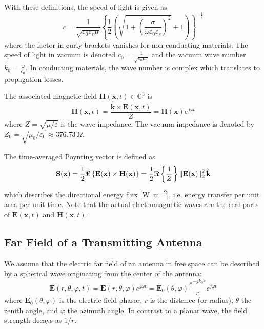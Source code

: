 With these definitions, the speed of light is given as~\cite[Eq. 4-28d]{Balanis}
\begin{equation}
    c=\frac{1}{\sqrt{\varepsilon_0\varepsilon_r\mu}}\left\{\frac12\left(\sqrt{1+\left(\frac{\sigma}{\omega\varepsilon_0\varepsilon_r}\right)^2}+1\right)\right\}^{-\frac{1}{2}}
\end{equation}
where the factor in curly brackets vanishes for non-conducting materials. The speed of light in vacuum is denoted $c_0=\frac{1}{\sqrt{\varepsilon_0 \mu_0}}$ and the vacuum wave number $k_0=\frac{\omega}{c_0}$. In conducting materials, the wave number is complex which translates to propagation losses.

The associated magnetic field $\mathbf{H}(\mathbf{x}, t)\in\mathbb{C}^3$ is
\begin{equation}
    \mathbf{H}(\mathbf{x}, t) = \frac{\hat{\mathbf{k}}\times  \mathbf{E}(\mathbf{x}, t)}{Z} = \mathbf{H}(\mathbf{x})e^{j\omega t}
\end{equation}
where $Z=\sqrt{\mu/\varepsilon}$ is the wave impedance. The vacuum impedance is denoted by $Z_0=\sqrt{\mu_0/\varepsilon_0}\approx 376.73\,\Omega$.

The time-averaged Poynting vector is defined as
\begin{equation}
    \mathbf{S}(\mathbf{x}) = \frac{1}{2} \Re\left\{\mathbf{E}(\mathbf{x})\times  \mathbf{H}(\mathbf{x})\right\}
                           = \frac{1}{2} \Re\left\{\frac{1}{Z} \right\} \left\lVert\mathbf{E}(\mathbf{x})\right\rVert_2^2 \hat{\mathbf{k}}
\end{equation}
which describes the directional energy flux [\si{\watt\per\meter\squared}], i.e. energy transfer per unit area per unit time.
Note that the actual electromagnetic waves are the real parts of $\mathbf{E}(\mathbf{x}, t)$ and $\mathbf{H}(\mathbf{x}, t)$.

\subsection{Far Field of a Transmitting Antenna}
\label{sec:primer-em-tx-far-field}

We assume that the electric far field of an antenna in free space can be described by a spherical wave originating from the center of the antenna:
\begin{equation}
    \mathbf{E}(r, \theta, \varphi, t) = \mathbf{E}(r,\theta, \varphi) e^{j\omega t} = \mathbf{E}_0(\theta, \varphi) \frac{e^{-jk_0r}}{r} e^{j\omega t}
\end{equation}
where $\mathbf{E}_0(\theta, \varphi)$ is the electric field phasor, $r$ is the distance (or radius), $\theta$ the zenith angle, and $\varphi$ the azimuth angle.
In contrast to a planar wave, the field strength decays as $1/r$.

